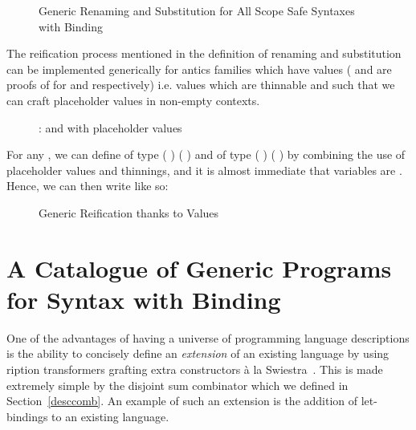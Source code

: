 \begin{figure}[h]
\begin{minipage}{0.45\textwidth}
\end{minipage}\hspace{2em}
\begin{minipage}{0.45\textwidth}
\end{minipage}
\caption{Generic Renaming and Substitution for All Scope Safe Syntaxes with Binding}
\end{figure}

The reification process mentioned in the definition of renaming
and substitution can be implemented generically for antics
families which have  values ( and 
are proofs of  for  and  respectively) i.e.
values which are thinnable and such that we can craft placeholder values
in non-empty contexts.

\begin{figure}[h]
\caption{:  and with placeholder values}
\end{figure}

For any  , we can define  of
type {( )  ( \AF{++} )} and  of
type {( )  ( \AF{++} )} by combining the use
of placeholder values and thinnings, and it is almost immediate that variables
are . Hence, we can then write  like so:

\begin{figure}[h]
\caption{Generic Reification thanks to  Values}
\end{figure}




\section{A Catalogue of Generic Programs for Syntax with Binding}

One of the advantages of having a universe of programming language
descriptions is the ability to concisely define an \emph{extension}
of an existing language by using ription transformers
grafting extra constructors à la Swiestra~\citeyear{swierstra_2008}.
This is made extremely simple by the
disjoint sum combinator  which we defined in Section~\ref{desccomb}.
An example of such an extension is the addition of let-bindings to
an existing language.

